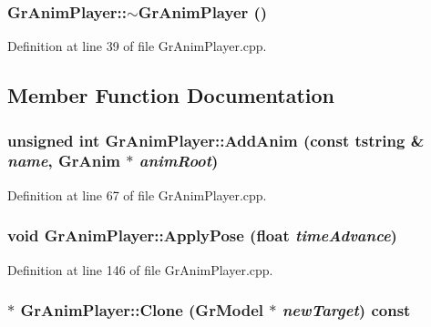 \begin{CompactItemize}
{\subsubsection[{$\sim$GrAnimPlayer}]{\setlength{\rightskip}{0pt plus 5cm}GrAnimPlayer::$\sim$GrAnimPlayer ()}}
\label{class_gr_anim_player_86fd4d9f14bdc935bc704d3ec4b069d1}




Definition at line 39 of file GrAnimPlayer.cpp.

\subsection{Member Function Documentation}
\hypertarget{class_gr_anim_player_1207033fa4b66842478bd2d7d30c7925}{
\subsubsection[{AddAnim}]{\setlength{\rightskip}{0pt plus 5cm}unsigned int GrAnimPlayer::AddAnim (const {\bf tstring} \& {\em name}, \/  {\bf GrAnim} $\ast$ {\em animRoot})}}
\label{class_gr_anim_player_1207033fa4b66842478bd2d7d30c7925}




Definition at line 67 of file GrAnimPlayer.cpp.\hypertarget{class_gr_anim_player_5a21c0ec51c825365b37a34b05cbfad5}{
\subsubsection[{ApplyPose}]{\setlength{\rightskip}{0pt plus 5cm}void GrAnimPlayer::ApplyPose (float {\em timeAdvance})}}
\label{class_gr_anim_player_5a21c0ec51c825365b37a34b05cbfad5}




Definition at line 146 of file GrAnimPlayer.cpp.\hypertarget{class_gr_anim_player_6e2dfd70dbaf0a5040f2083c1a0ba6c9}{
\subsubsection[{Clone}]{ $\ast$ GrAnimPlayer::Clone ({\bf GrModel} $\ast$ {\em newTarget}) const}}
\label{class_gr_anim_player_6e2dfd70dbaf0a5040f2083c1a0ba6c9}





\end{CompactItemize}
